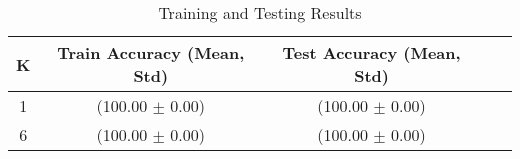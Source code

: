 \begin{table}[h!]
\centering
\begin{tabular}{|c|c|c|c|c|}
\hline
K & Train Accuracy (Mean, Std) & Test Accuracy (Mean, Std)\\
\hline
1 & (100.00 $\pm$ 0.00) & (100.00 $\pm$ 0.00)\\
6 & (100.00 $\pm$ 0.00) & (100.00 $\pm$ 0.00)\\
\hline
\end{tabular}
\caption{Training and Testing Results}
\label{tab:results}
\end{table}